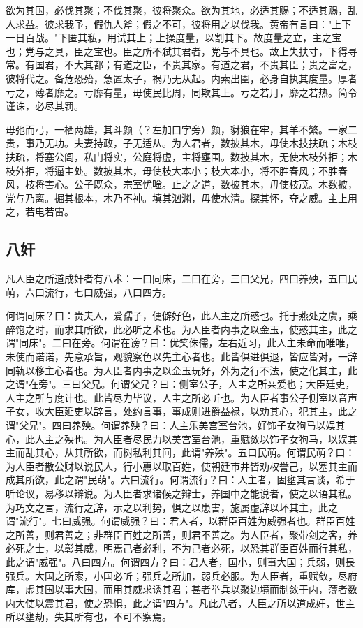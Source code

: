 \documentclass[]{article}
\begin{document}
欲为其国，必伐其聚；不伐其聚，彼将聚众。欲为其地，必适其赐；不适其赐，乱人求益。彼求我予，假仇人斧；假之不可，彼将用之以伐我。黄帝有言曰："上下一日百战。"下匿其私，用试其上；上操度量，以割其下。故度量之立，主之宝也；党与之具，臣之宝也。臣之所不弑其君者，党与不具也。故上失扶寸，下得寻常。有国君，不大其都；有道之臣，不贵其家。有道之君，不贵其臣；贵之富之，彼将代之。备危恐殆，急置太子，祸乃无从起。内索出圉，必身自执其度量。厚者亏之，薄者靡之。亏靡有量，毋使民比周，同欺其上。亏之若月，靡之若热。简令谨诛，必尽其罚。

毋弛而弓，一栖两雄，其斗颜（？左加口字旁）颜，豺狼在牢，其羊不繁。一家二贵，事乃无功。夫妻持政，子无适从。为人君者，数披其木，毋使木技扶疏；木枝扶疏，将塞公闾，私门将实，公庭将虚，主将壅围。数披其木，无使木枝外拒；木枝外拒，将逼主处。数披其木，毋使枝大本小；枝大本小，将不胜春风；不胜春风，枝将害心。公子既众，宗室忧唫。止之之道，数披其木，毋使枝茂。木数披，党与乃离。掘其根本，木乃不神。填其汹渊，毋使水清。探其怀，夺之威。主上用之，若电若雷。

\hypertarget{header-n861}{%
\subsection{八奸}\label{header-n861}}

凡人臣之所道成奸者有八术：一曰同床，二曰在旁，三曰父兄，四曰养殃，五曰民萌，六曰流行，七曰威强，八曰四方。

何谓同床？曰：贵夫人，爱孺子，便僻好色，此人主之所惑也。托于燕处之虞，乘醉饱之时，而求其所欲，此必听之术也。为人臣者内事之以金玉，使惑其主，此之谓"同床"。二曰在旁。何谓在谤？曰：优笑侏儒，左右近习，此人主未命而唯唯，未使而诺诺，先意承旨，观貌察色以先主心者也。此皆俱进俱退，皆应皆对，一辞同轨以移主心者也。为人臣者内事之以金玉玩好，外为之行不法，使之化其主，此之谓"在旁"。三曰父兄。何谓父兄？曰：侧室公子，人主之所亲爱也；大臣廷吏，人主之所与度计也。此皆尽力毕议，人主之所必听也。为人臣者事公子侧室以音声子女，收大臣延吏以辞言，处约言事，事成则进爵益禄，以劝其心，犯其主，此之谓"父兄"。四曰养殃。何谓养殃？曰：人主乐美宫室台池，好饰子女狗马以娱其心，此人主之殃也。为人臣者尽民力以美宫室台池，重赋敛以饰子女狗马，以娱其主而乱其心，从其所欲，而树私利其间，此谓"养殃"。五曰民萌。何谓民萌？曰：为人臣者散公财以说民人，行小惠以取百姓，使朝廷市井皆劝权誉己，以塞其主而成其所欲，此之谓"民萌"。六曰流行。何谓流行？曰：人主者，固壅其言谈，希于听论议，易移以辩说。为人臣者求诸候之辩士，养国中之能说者，使之以语其私。为巧文之言，流行之辞，示之以利势，惧之以患害，施属虚辞以坏其主，此之谓"流行"。七曰威强。何谓威强？曰：君人者，以群臣百姓为威强者也。群臣百姓之所善，则君善之；非群臣百姓之所善，则君不善之。为人臣者，聚带剑之客，养必死之士，以彰其威，明焉己者必利，不为己者必死，以恐其群臣百姓而行其私，此之谓"威强"。八曰四方。何谓四方？曰：君人者，国小，则事大国；兵弱，则畏强兵。大国之所索，小国必听；强兵之所加，弱兵必服。为人臣者，重赋敛，尽府库，虚其国以事大国，而用其威求诱其君；甚者举兵以聚边境而制敛于内，薄者数内大使以震其君，使之恐惧，此之谓"四方"。凡此八者，人臣之所以道成奸，世主所以壅劫，失其所有也，不可不察焉。
\end{document}
